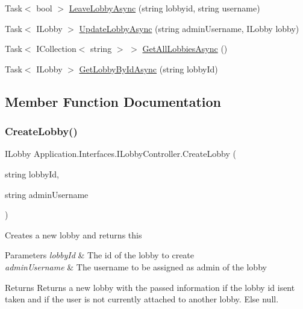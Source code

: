\begin{DoxyCompactItemize}
Task$<$ bool $>$ \mbox{\hyperlink{interface_application_1_1_interfaces_1_1_i_lobby_controller_a46975c7e9219d5324f786542a23d9e7e}{Leave\+Lobby\+Async}} (string lobbyid, string username)
\item 
Task$<$ I\+Lobby $>$ \mbox{\hyperlink{interface_application_1_1_interfaces_1_1_i_lobby_controller_a40457a8fb8d6801a8e42f1e75f9d3480}{Update\+Lobby\+Async}} (string admin\+Username, I\+Lobby lobby)
\item 
Task$<$ I\+Collection$<$ string $>$ $>$ \mbox{\hyperlink{interface_application_1_1_interfaces_1_1_i_lobby_controller_acf938121367844d623fa4127cf643e50}{Get\+All\+Lobbies\+Async}} ()
\item 
Task$<$ I\+Lobby $>$ \mbox{\hyperlink{interface_application_1_1_interfaces_1_1_i_lobby_controller_abe3ce90e900391a0c4ffa25195800ab2}{Get\+Lobby\+By\+Id\+Async}} (string lobby\+Id)
\end{DoxyCompactItemize}


\subsection{Member Function Documentation}
\mbox{\label{interface_application_1_1_interfaces_1_1_i_lobby_controller_abefe3510b20e3db41c4d8062f8cdc2bc}} 
\subsubsection{\texorpdfstring{Create\+Lobby()}{CreateLobby()}}
{\footnotesize\ttfamily I\+Lobby Application.\+Interfaces.\+I\+Lobby\+Controller.\+Create\+Lobby (\begin{DoxyParamCaption}\item[{string}]{lobby\+Id,  }\item[{string}]{admin\+Username }\end{DoxyParamCaption})}



Creates a new lobby and returns this 


\begin{DoxyParams}{Parameters}
{\em lobby\+Id} & The id of the lobby to create\\
\hline
{\em admin\+Username} & The username to be assigned as admin of the lobby\\
\hline
\end{DoxyParams}
\begin{DoxyReturn}{Returns}
Returns a new lobby with the passed information if the lobby id isen\textquotesingle{}t taken and if the user is not currently attached to another lobby. Else null.
\end{DoxyReturn}


